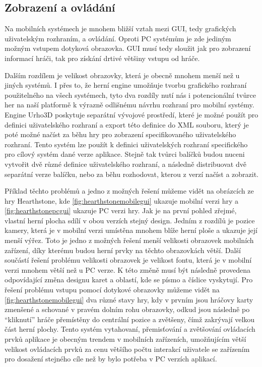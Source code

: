 \subsection{Zobrazení a ovládání}
Na mobilních systémech je mnohem bližší vztah mezi GUI, tedy grafických uživatelským rozhraním, a ovládání. Oproti PC systémům je zde jediným možným vstupem dotyková obrazovka. GUI musí tedy sloužit jak pro zobrazení informací hráči, tak pro získání drtivé většiny vstupu od hráče. 

Dalším rozdílem je velikost obrazovky, která je obecně mnohem menší než u jiných systémů. I přes to, že herní engine umožňuje tvorbu grafického rozhraní použitelného na všech systémech, tyto dva rozdíly nutí nás i potencionální tvůrce her na naší platformě k výrazně odlišnému návrhu rozhraní pro mobilní systémy. Engine Urho3D poskytuje separátní vývojové prostředí, které je možné použít pro definici uživatelského rozhraní a export této definice do XML souboru, který je poté možné načíst za běhu hry pro zobrazení specifikovaného uživatelského rozhraní. Tento systém lze použít k definici uživatelských rozhraní specifického pro cílový systém dané verze aplikace. Stejně tak tvůrci balíčků budou nuceni vytvořit dvě různé definice uživatelského rozhraní, a následně distribuovat dvě separátní verze balíčku, nebo za běhu rozhodovat, kterou z verzí načíst a zobrazit.

Příklad těchto problémů a jedno z možných řešení můžeme vidět na obrázcích ze hry Hearthstone\citep{site:hearthstone}, kde  \ref{fig:hearthstonemobilegui} ukazuje mobilní verzi hry a \ref{fig:hearthstonepcgui} ukazuje PC verzi hry. Jak je na první pohled zřejmé, vlastní herní plocha sdílí v obou verzích stejný design. Jedním z rozdílů je pozice kamery, která je v mobilní verzi umístěna mnohem blíže herní ploše a ukazuje její menší výřez. Toto je jedno z možných řešení menší velikosti obrazovek mobilních zařízení, díky kterému budou herní prvky na těchto obrazovkách větší. Další součástí řešení problému velikosti obrazovek je velikost fontu, která je v mobilní verzi mnohem větší než u PC verze. K této změně musí být následně provedena odpovídající změna designu karet a oblastí, kde se písmo a číslice vyskytují. Pro řešení problému vstupu pomocí dotykové obrazovky můžeme vidět na \ref{fig:hearthstonemobilegui} dva různé stavy hry, kdy v prvním jsou hráčovy karty zmenšené a schované v pravém dolním rohu obrazovky, odkud jsou následně po ``kliknutí'' hráče přemístěny do centrální pozice a zvětšeny, čímž zakrývají velkou část herní plochy. Tento systém vytahovaní, přemisťování a zvětšování ovládacích prvků aplikace je obecným trendem v mobilních zařízeních, umožňujícím větší velikost ovládacích prvků za cenu většího počtu interakcí uživatele se zařízením pro dosažení stejného cíle než by bylo potřeba v PC verzích aplikací. 

